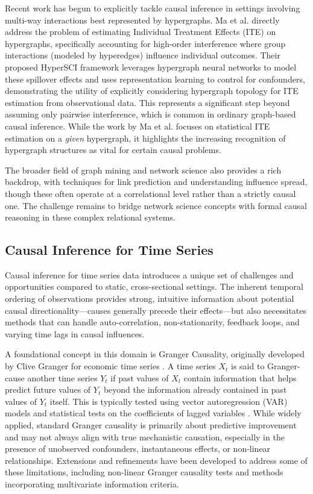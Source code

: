 {Recent work has begun to explicitly tackle causal inference in settings involving multi-way interactions best represented by hypergraphs. Ma et al. \cite{ma2022learning} directly address the problem of estimating Individual Treatment Effects (ITE) on hypergraphs, specifically accounting for high-order interference where group interactions (modeled by hyperedges) influence individual outcomes. Their proposed HyperSCI framework leverages hypergraph neural networks to model these spillover effects and uses representation learning to control for confounders, demonstrating the utility of explicitly considering hypergraph topology for ITE estimation from observational data. This represents a significant step beyond assuming only pairwise interference, which is common in ordinary graph-based causal inference. While the work by Ma et al. focuses on statistical ITE estimation on a \textit{given} hypergraph, it highlights the increasing recognition of hypergraph structures as vital for certain causal problems.

The broader field of graph mining and network science also provides a rich backdrop, with techniques for link prediction and understanding influence spread, though these often operate at a correlational level rather than a strictly causal one. The challenge remains to bridge network science concepts with formal causal reasoning in these complex relational systems.


\subsection{Causal Inference for Time Series}
\label{subsec:causal_timeseries}

Causal inference for time series data introduces a unique set of challenges and opportunities compared to static, cross-sectional settings. The inherent temporal ordering of observations provides strong, intuitive information about potential causal directionality---causes generally precede their effects---but also necessitates methods that can handle auto-correlation, non-stationarity, feedback loops, and varying time lags in causal influences.

A foundational concept in this domain is Granger Causality, originally developed by Clive Granger for economic time series \cite{Granger1969Investigating, granger1980testing}. A time series $X_t$ is said to Granger-cause another time series $Y_t$ if past values of $X_t$ contain information that helps predict future values of $Y_t$ beyond the information already contained in past values of $Y_t$ itself. This is typically tested using vector autoregression (VAR) models and statistical tests on the coefficients of lagged variables \cite{geweke1982measurement, padav2021granger}. While widely applied, standard Granger causality is primarily about predictive improvement and may not always align with true mechanistic causation, especially in the presence of unobserved confounders, instantaneous effects, or non-linear relationships. Extensions and refinements have been developed to address some of these limitations, including non-linear Granger causality tests and methods incorporating multivariate information criteria.

}
